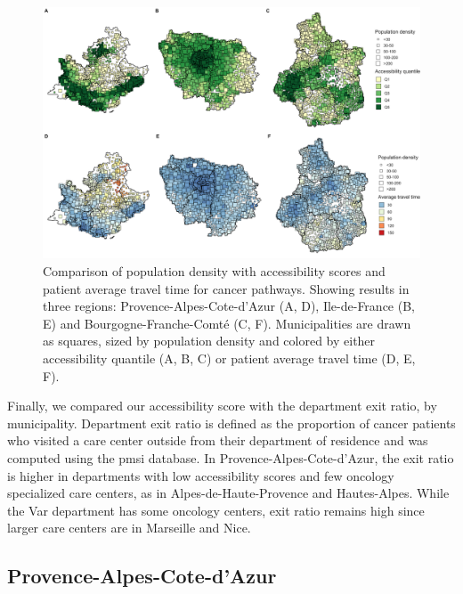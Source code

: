 \begin{figure}[h]
    \includegraphics[width=\textwidth]{images/camion/fig3_accessibility_vs_density_scatter_map.png}
    \centering
    \caption{
        Comparison of population density with accessibility scores and patient average travel time for cancer pathways. Showing results in three regions: Provence-Alpes-Cote-d’Azur (A, D), Ile-de-France (B, E) and Bourgogne-Franche-Comté (C, F). Municipalities are drawn as squares, sized by population density and colored by either accessibility quantile (A, B, C) or patient average travel time (D, E, F).
    }
    \label{fig:accessibility-vs-density}
\end{figure}

Finally, we compared our accessibility score with the department exit ratio, by municipality. Department exit ratio is defined as the proportion of cancer patients who visited a care center outside from their department of residence and was computed using the \ac{pmsi} database. In Provence-Alpes-Cote-d'Azur, the exit ratio is higher in departments with low accessibility scores and few oncology specialized care centers, as in Alpes-de-Haute-Provence and Hautes-Alpes. While the Var department has some oncology centers, exit ratio remains high since larger care centers are in Marseille and Nice.

\subsection*{Provence-Alpes-Cote-d'Azur}

